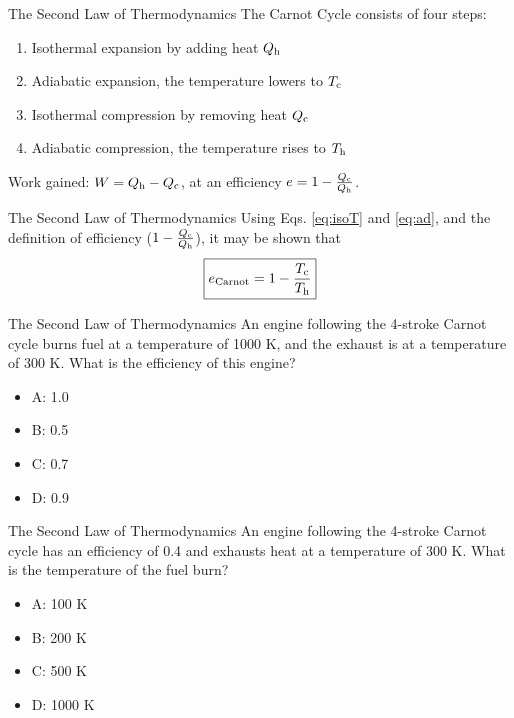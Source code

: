 \documentclass{beamer}
\begin{document}
\begin{frame}{The Second Law of Thermodynamics}
The Carnot Cycle consists of four steps:
\begin{enumerate}
\item Isothermal expansion by adding heat $Q_{\rm h}$
\item Adiabatic expansion, the temperature lowers to $T_{\rm c}$
\item Isothermal compression by removing heat $Q_{\rm c}$
\item Adiabatic compression, the temperature rises to $T_{\rm h}$
\end{enumerate}
Work gained: $W = Q_{\rm h} - Q_{\rm c}$, at an efficiency $e = 1-\frac{Q_{\rm c}}{Q_{\rm h}}$.
\end{frame}

\begin{frame}{The Second Law of Thermodynamics}
Using Eqs. \ref{eq:isoT} and \ref{eq:ad}, and the definition of efficiency ($1-\frac{Q_{\rm c}}{Q_{\rm h}}$), it may be shown that
\begin{equation}
\boxed{
e_{\rm Carnot} = 1 - \frac{T_{\rm c}}{T_{\rm h}}}
\end{equation}
\end{frame}

\begin{frame}{The Second Law of Thermodynamics}
An engine following the 4-stroke Carnot cycle burns fuel at a temperature of 1000 K, and the exhaust is at a temperature of 300 K.  What is the efficiency of this engine?
\begin{itemize}
\item A: 1.0
\item B: 0.5
\item C: 0.7
\item D: 0.9
\end{itemize}
\end{frame}

\begin{frame}{The Second Law of Thermodynamics}
An engine following the 4-stroke Carnot cycle has an efficiency of 0.4 and exhausts heat at a temperature of 300 K.  What is the temperature of the fuel burn?
\begin{itemize}
\item A: 100 K
\item B: 200 K
\item C: 500 K
\item D: 1000 K
\end{itemize}
\end{frame}
\end{document}
